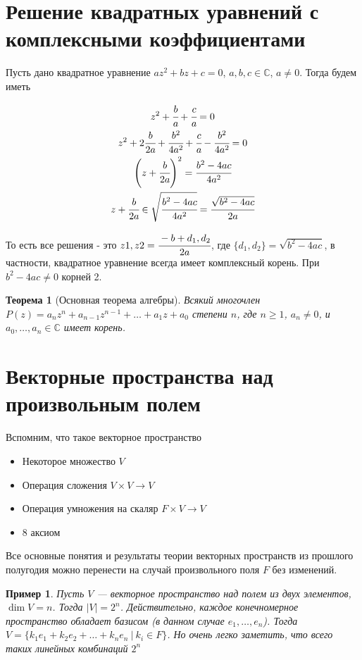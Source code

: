 \documentclass[a4paper,12pt]{article}
\newtheorem*{Examples}{Пример}
\newtheorem*{Theorem}{Теорема}
\begin{document}
\section*{Решение квадратных уравнений с комплексными коэффициентами}

Пусть дано квадратное уравнение $az^2+bz+c=0$, $a,b,c\in\mathbb{C}$, $a \neq 0$. Тогда будем иметь

\begin{gather*}
    z^2+\cfrac{b}{a}+\cfrac{c}{a} = 0\\
    z^2+2\cfrac{b}{2a}+\cfrac{b^2}{4a^2}+\cfrac{c}{a}-\cfrac{b^2}{4a^2} = 0\\
    \left(z+\cfrac{b}{2a}\right)^2=\cfrac{b^2-4ac}{4a^2}\\
    z+\cfrac{b}{2a} \in \sqrt{\cfrac{b^2-4ac}{4a^2}}=\cfrac{\sqrt{b^2-4ac}}{2a}
\end{gather*}

То есть все решения - это $z1,z2 = \cfrac{-b+d_1,d_2}{2a}$, где $\{d_1,d_2\} = \sqrt{b^2-4ac}$, в частности, квадратное уравнение всегда имеет комплексный корень. При $b^2-4ac\neq0$ корней 2.

\begin{Theorem}[Основная теорема алгебры]
Всякий многочлен $P\left(z\right) = a_nz^n + a_{n-1}z^{n-1} + \ldots + a_1z + a_0$ степени $n$, где $n \geqslant 1$, $a_n \neq 0$, и $a_0,\ldots,a_n \in \mathbb{C}$ имеет корень.
\end{Theorem}

\section{Векторные пространства над произвольным полем}

Вспомним, что такое векторное пространство

\begin{itemize}
    \item Некоторое множество $V$
    \item Операция сложения $V\times V\rightarrow V$
    \item Операция умножения на скаляр $F\times V\rightarrow V$
    \item 8 аксиом
\end{itemize}

Все основные понятия и результаты теории векторных пространств из прошлого полугодия можно перенести на случай произвольного поля $F$ без изменений.

\begin{Examples}
Пусть $V$ --- векторное пространство над полем из двух элементов, $\dim V = n$. Тогда $|V| = 2^n$. Действительно, каждое конечномерное пространство обладает базисом (в данном случае $e_1,\ldots,e_n$). Тогда $V = \{k_1e_1+k_2e_2+\ldots+k_ne_n\ |\ k_i\in F\}$. Но очень легко заметить, что всего таких линейных комбинаций $2^n$
\end{Examples}
\end{document}
